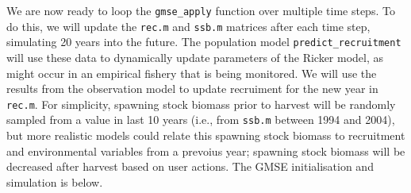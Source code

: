 \documentclass[]{article}
\begin{document}
We are now ready to loop the \texttt{gmse\_apply} function over multiple
time steps. To do this, we will update the \texttt{rec.m} and
\texttt{ssb.m} matrices after each time step, simulating 20 years into
the future. The population model \texttt{predict\_recruitment} will use
these data to dynamically update parameters of the Ricker model, as
might occur in an empirical fishery that is being monitored. We will use
the results from the observation model to update recruiment for the new
year in \texttt{rec.m}. For simplicity, spawning stock biomass prior to
harvest will be randomly sampled from a value in last 10 years (i.e.,
from \texttt{ssb.m} between 1994 and 2004), but more realistic models
could relate this spawning stock biomass to recruitment and
environmental variables from a prevoius year; spawning stock biomass
will be decreased after harvest based on user actions. The GMSE
initialisation and simulation is below.
\end{document}
